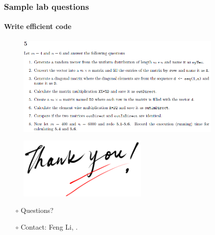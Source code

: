 \documentclass[10pt]{beamer}
\begin{document}
\begin{frame}
  \frametitle{Sample lab questions}
  \framesubtitle{Write efficient code}
  \begin{figure}
    \centering
    \includegraphics[width=0.9\textwidth]{matrix}
  \end{figure}
\end{frame}


\begin{frame}[plain]
  \addtocounter{framenumber}{-1}
  \begin{center}
    \begin{figure}
      \includegraphics[height=3.0cm]{thankyou}
    \end{figure}
  \end{center}


\begin{itemize}
\item [$\circ$] Questions?
\item [$\circ$] Contact: Feng Li,
  \texttt{\color{purple}{<feng.li@stat.su.se>}}.%
\end{itemize}

\end{frame}
\end{document}
